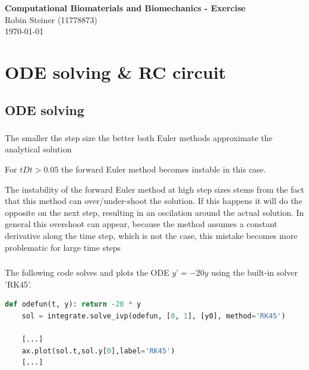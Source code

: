 \documentclass{article}
\begin{document}
    \begin{center}
        \textbf{\Large Computational Biomaterials and Biomechanics - Exercise} \\
        \vspace{0.2cm}
        Robin Steiner (11778873)\\
        \vspace{0.2cm}
        \today \\
    \end{center}


    \section{ODE solving \& RC circuit}

    \subsection{ODE solving}

    \subsubsection{}
    The smaller the step size the better both Euler methods approximate the analytical solution

    \vspace{10pt}
    For $tDt > 0.05$ the forward Euler method becomes instable in this case.

    \vspace{10pt}
    The instability of the forward Euler method at high step sizes stems from the fact that this method can over/under-shoot the solution.
    If this happens it will do the opposite on the next step, resulting in an oscilation around the actual solution.
    In general this overshoot can appear, because the method assumes a constant derivative along the time step, which is not the case,
    this mistake becomes more problematic for large time steps

    \subsubsection{}
    The following code solves and plots the ODE $y’=-20y$ using the built-in solver 'RK45'.
    \begin{lstlisting}[language=Python, style=mystyle]
    def odefun(t, y): return -20 * y
    sol = integrate.solve_ivp(odefun, [0, 1], [y0], method='RK45')

    [...]
    ax.plot(sol.t,sol.y[0],label='RK45')
    [...]
    \end{lstlisting}
\end{document}
